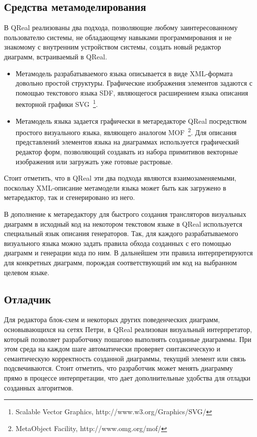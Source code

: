 \documentclass[a4paper]{article}
\begin{document}
\subsection*{Средства метамоделирования}

В QReal реализованы два подхода, позволяющие любому заинтересованному пользователю системы, не обладающему навыками программирования и не знакомому с внутренним устройством системы, создать новый редактор диаграмм, встраиваемый в QReal.
\begin{itemize}
  \item Метамодель разрабатываемого языка описывается в виде XML-формата довольно простой структуры. Графические изображения элементов задаются с помощью текстового языка SDF, являющегося расширением языка описания векторной графики SVG~\footnote{Scalable Vector Graphics, http://www.w3.org/Graphics/SVG/}.
  \item Метамодель языка задается графически в метаредакторе QReal посредством простого визуального языка, являющего аналогом MOF~\footnote{MetaObject Facility, http://www.omg.org/mof/}. Для описания представлений элементов языка на диаграммах используется графический редактор форм, позволяющий создавать из набора примитивов векторные изображения или загружать уже готовые растровые.
\end{itemize}
Стоит отметить, что в QReal эти два подхода являются взаимозаменяемыми, поскольку XML-описание метамодели языка может быть как загружено в метаредактор, так и сгенерировано из него. 

В дополнение к метаредактору для быстрого создания трансляторов визуальных диаграмм в исходный код на некотором текстовом языке в QReal используется специальный язык описания генераторов. Так, для каждого разрабатываемого визуального языка можно задать правила обхода созданных с его помощью диаграмм и генерации кода по ним. В дальнейшем эти правила интерпретируются для конкретных диаграмм, порождая соответствующий им код на выбранном целевом языке.
  
\subsection*{Отладчик}

Для редактора блок-схем и некоторых других поведенческих диаграмм, основывающихся на сетях Петри, в QReal реализован визуальный интерпретатор, который позволяет разработчику пошагово выполнять созданные диаграммы. При этом среда на каждом шаге автоматически проверяет синтаксическую и семантическую корректность созданной диаграммы, текущий элемент или связь подсвечиваются. Стоит отметить, что разработчик может менять диаграмму прямо в процессе интерпретации, что дает дополнительные удобства для отладки созданных алгоритмов. 
  
\end{document}
